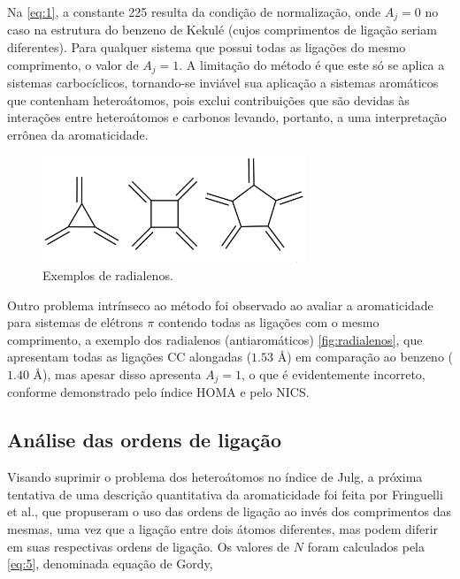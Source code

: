 Na \autoref{eq:1}, a constante 225 resulta da condição de normalização, onde $A_j = 0$ no caso na estrutura do benzeno de Kekulé (cujos comprimentos de ligação seriam diferentes). Para qualquer sistema que possui todas as ligações do mesmo comprimento, o valor de $A_j = 1$. A limitação do método é que este só se aplica a sistemas carbocíclicos, tornando-se inviável sua aplicação a sistemas aromáticos que contenham heteroátomos, pois exclui contribuições que são devidas às interações entre heteroátomos e carbonos levando, portanto, a uma interpretação errônea da aromaticidade.

\begin{figure}[htb]
	\caption{\label{fig:radialenos} Exemplos de radialenos.}
	\begin{center}
		\includegraphics[width=0.70\textwidth]{images/Screenshot from 2022-07-13 13-24-27.png}
	\end{center}
\end{figure}

Outro problema intrínseco ao método foi observado ao avaliar a aromaticidade para sistemas de elétrons $\pi$ contendo todas as ligações com o mesmo comprimento, a exemplo dos radialenos (antiaromáticos) \autoref{fig:radialenos}, que apresentam todas as ligações CC alongadas ($1.53$ \AA) em comparação ao benzeno ($1.40$ \AA), mas apesar disso apresenta $A_j = 1$, o que é evidentemente incorreto, conforme demonstrado pelo índice \gls{HOMA} e pelo NICS.

\subsection{Análise das ordens de ligação}

Visando suprimir o problema dos heteroátomos no índice de Julg, a próxima tentativa de uma descrição quantitativa da aromaticidade foi feita por Fringuelli et al.\autocite{Fringuelli1974}, que propuseram o uso das ordens de ligação ao invés dos comprimentos das mesmas, uma vez que a ligação entre dois átomos diferentes, mas podem diferir em suas respectivas ordens de ligação. Os valores de $N$ foram calculados pela \autoref{eq:5}, denominada equação de Gordy\autocite{Gordy1947},

